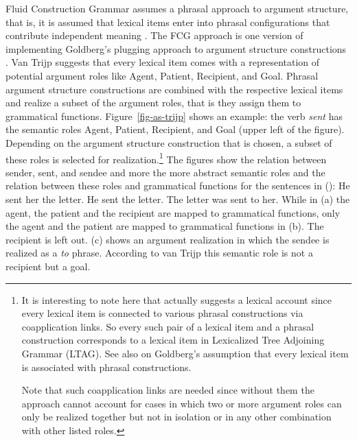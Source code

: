Fluid Construction Grammar assumes a phrasal approach to argument structure, that is, it is assumed that lexical items enter
into phrasal configurations that contribute independent meaning \citep{vanTrijp2011a}. The FCG
approach is one version of implementing Goldberg's plugging approach to argument structure
constructions \citep{Goldberg95a}. Van Trijp suggests that every lexical item comes with a representation of
potential argument roles like Agent, Patient, Recipient, and Goal. Phrasal argument structure
constructions are combined with the respective lexical items and realize a subset of the argument
roles, that is they assign them to grammatical functions. Figure~\ref{fig-as-trijp} shows an
example: the verb \emph{sent} has the semantic roles Agent, Patient, Recipient, and Goal  (upper left
of the figure). Depending
on the argument structure construction that is chosen, a subset of these roles is selected for
realization.\footnote{%
  It is interesting to note here that \citet[]{vanTrijp2011a} actually suggests a lexical
  account since every lexical item is connected to various phrasal constructions via coapplication
  links. So every such pair of a lexical item and a phrasal construction corresponds to a lexical
  item in Lexicalized Tree Adjoining Grammar (LTAG). See also  on
  Goldberg's assumption that every lexical item is associated with phrasal constructions.

Note that such coapplication links are needed since without them the approach cannot account for
cases in which two or more argument roles can only be realized together but not in isolation or in
any other combination with other listed roles.
}
The figures show the relation between sender, sent, and sendee and more the more abstract semantic
roles and the relation between these roles and grammatical functions for the sentences in ():
\eal
\ex He sent her the letter.
\ex He sent the letter.
\ex The letter was sent to her.
\zl
While in (a) the agent, the patient and the recipient are mapped to grammatical functions,
only the agent and the patient are mapped to grammatical functions in (b). The recipient is
left out. (c) shows an argument realization in which the sendee is realized as a \emph{to}
  phrase. According to van Trijp this semantic role is not a recipient but a goal. 


